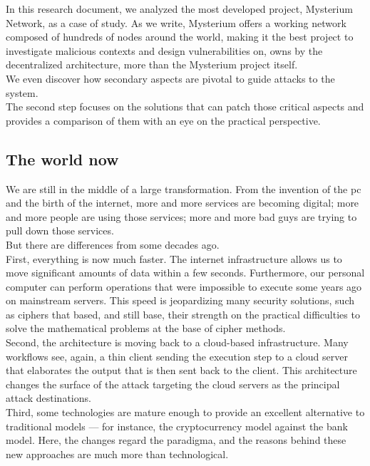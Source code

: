 \documentclass[]{article}
\begin{document}
    In this research document, we analyzed the most developed project, Mysterium Network, as a case of study. As we write, Mysterium offers a working network composed of hundreds of nodes around the world, making it the best project to investigate malicious contexts and design vulnerabilities on, owns by the decentralized architecture, more than the Mysterium project itself.\\
	We even discover how secondary aspects are pivotal to guide attacks to the system.\\
    The second step focuses on the solutions that can patch those critical aspects and provides a comparison of them with an eye on the practical perspective.
	
	\subsection{The world now}
	We are still in the middle of a large transformation. From the invention of the pc and the birth of the internet, more and more services are becoming digital; more and more people are using those services; more and more bad guys are trying to pull down those services.\\

	But there are differences from some decades ago.\\
	First, everything is now much faster. The internet infrastructure allows us to move significant amounts of data within a few seconds. Furthermore, our personal computer can perform operations that were impossible to execute some years ago on mainstream servers. This speed is jeopardizing many security solutions, such as ciphers that based, and still base, their strength on the practical difficulties to solve the mathematical problems at the base of cipher methods.\\
	Second, the architecture is moving back to a cloud-based infrastructure. Many workflows see, again, a thin client sending the execution step to a cloud server that elaborates the output that is then sent back to the client. This architecture changes the surface of the attack targeting the cloud servers as the principal attack destinations.\\
	Third, some technologies are mature enough to provide an excellent alternative to traditional models — for instance, the cryptocurrency model against the bank model. Here, the changes regard the paradigma, and the reasons behind these new approaches are much more than technological.\\
\end{document}
